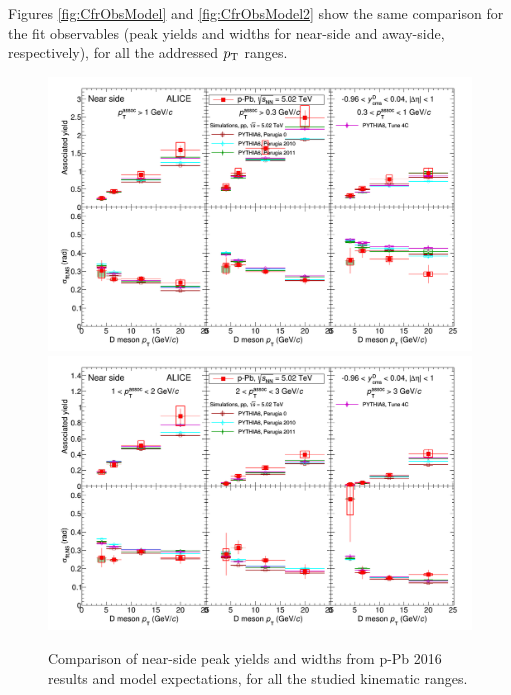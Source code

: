 Figures \ref{fig:CfrObsModel} and \ref{fig:CfrObsModel2} show the same comparison for the fit observables (peak yields and widths for near-side and away-side, respectively), for all the addressed $p_{\rm T}$ ranges. 

\begin{figure}[!htbp]
\centering
\landscape
{\includegraphics[width=\linewidth]{figures/CfrPPandModels/ComparePPbtoMCFitResults.png}}
{\includegraphics[width=\linewidth]{figures/CfrPPandModels/ComparePPbtoMCFitResults_2.png}}
\caption{Comparison of near-side peak yields and widths from p-Pb 2016 results and model expectations, for all the studied kinematic ranges.}
\label{fig:CfrAverageModel}
\end{figure}
